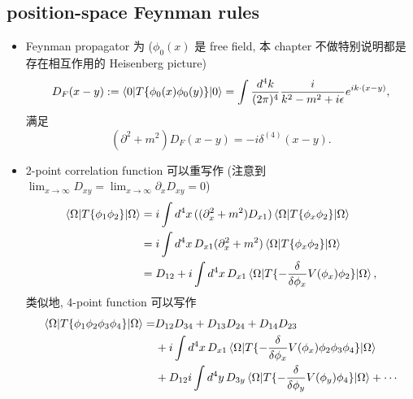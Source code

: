 \subsection{position-space Feynman rules}
\begin{itemize}
	\item Feynman propagator 为 ($\phi_0(x)$ 是 free field, 本 chapter 不做特别说明都是存在相互作用的 Heisenberg picture)
	\begin{equation}
		D_F(x - y) := \braket{0 | T\{\phi_0(x) \phi_0(y)\} | 0} = \int \frac{d^4 k}{(2 \pi)^4} \frac{i}{k^2 - m^2 + i \epsilon} e^{i k \cdot (x - y)},
	\end{equation}
	满足
	\begin{equation}
		(\partial^2 + m^2) D_F(x - y) = - i \delta^{(4)}(x - y).
	\end{equation}
	
	\item 2-point correlation function 可以重写作 (注意到 $\lim_{x \rightarrow \infty} D_{x y} = \lim_{x \rightarrow \infty} \partial_x D_{x y} = 0$)
	\begin{align}
		\braket{\Omega | T\{\phi_1 \phi_2\} | \Omega} &= i \int d^4 x \, ((\partial_x^2 + m^2) D_{x 1}) \braket{\Omega | T\{\phi_x \phi_2\} | \Omega} \notag \\
		&= i \int d^4 x \, D_{x 1} (\partial_x^2 + m^2) \braket{\Omega | T\{\phi_x \phi_2\} | \Omega} \notag \\
		&= D_{1 2} + i \int d^4 x \, D_{x 1} \braket{\Omega | T\{- \frac{\delta}{\delta \phi_x} V(\phi_x) \phi_2\} | \Omega},
	\end{align}
	类似地, 4-point function 可以写作
	\begin{align}
		\braket{\Omega | T\{\phi_1 \phi_2 \phi_3 \phi_4\} | \Omega} =& D_{1 2} D_{3 4} + D_{1 3} D_{2 4} + D_{1 4} D_{2 3} \notag \\
		& + i \int d^4 x \, D_{x 1} \braket{\Omega | T\{- \frac{\delta}{\delta \phi_x} V(\phi_x) \phi_2 \phi_3 \phi_4\} | \Omega} \notag \\
		& + D_{1 2} i \int d^4 y \, D_{3 y} \braket{\Omega | T\{- \frac{\delta}{\delta \phi_y} V(\phi_y) \phi_4\} | \Omega} + \cdots
	\end{align}
	

\end{itemize}
